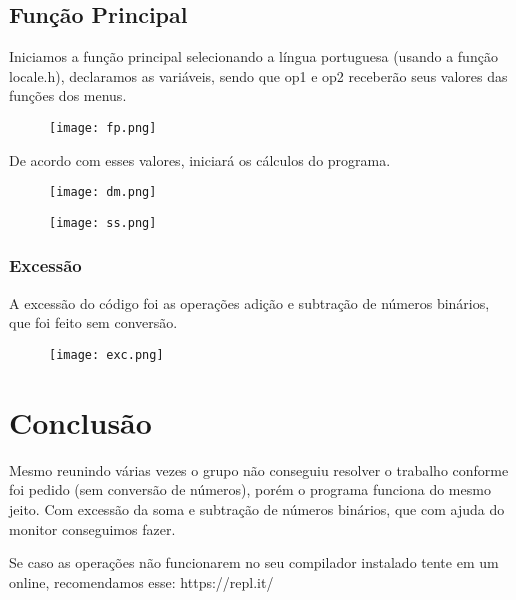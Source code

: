 \documentclass{article}
\begin{document}
 \subsection{Função Principal}
\par Iniciamos a função principal selecionando a língua portuguesa (usando a função locale.h), declaramos as variáveis, sendo que op1 e op2 receberão seus valores das funções dos menus.
 \begin{center}
 \begin{figure}[h]
 \centering
 \texttt{[image: fp.png]}
 \end{figure}
 \end{center}
 \par De acordo com esses valores, iniciará os cálculos do programa.
 \begin{center}
 \begin{figure}[h]
 \centering
 \texttt{[image: dm.png]}
 \end{figure}
 \begin{figure}[h]
 \centering
 \texttt{[image: ss.png]}
 \end{figure}
 \end{center}
 \subsubsection{Excessão}
\par A excessão do código foi as operações adição e subtração de números binários, que foi feito sem conversão.
 \begin{center}
 \begin{figure}[h]
 \centering
 \texttt{[image: exc.png]}
 \end{figure}
 \end{center}
\section{Conclusão}
\par Mesmo reunindo várias vezes o grupo não conseguiu resolver o trabalho conforme foi pedido (sem conversão de números), porém o programa funciona do mesmo jeito. Com excessão da soma e subtração de números binários, que com ajuda do monitor conseguimos fazer.
\par Se caso as operações não funcionarem no seu compilador instalado tente em um online, recomendamos esse: https://repl.it/
\end{document}
